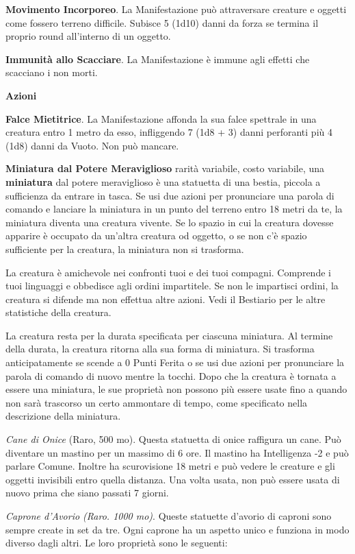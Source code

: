\begin{multicols}{2}
\textbf{Movimento Incorporeo}. La Manifestazione può attraversare creature e oggetti come fossero terreno difficile. Subisce 5 (1d10) danni da forza se termina il proprio round all'interno di un oggetto.

\textbf{Immunità allo Scacciare}. La Manifestazione è immune agli effetti che scacciano i non morti.

\textbf{Azioni}

\textbf{Falce Mietitrice}. La Manifestazione affonda la sua falce spettrale in una creatura entro 1 metro da esso, infliggendo 7 (1d8 + 3) danni perforanti più 4 (1d8) danni da Vuoto. Non può mancare.

\smallskip*\hypertarget{Miniatura dal Potere Meraviglioso}{} \textbf{Miniatura dal Potere Meraviglioso} rarità variabile, costo variabile, una \textbf{miniatura} dal potere meraviglioso è una statuetta di una bestia, piccola a sufficienza da entrare in tasca. Se usi due azioni per pronunciare una parola di comando e lanciare la miniatura in un punto del terreno entro 18 metri da te, la miniatura diventa una creatura vivente. Se lo spazio in cui la creatura dovesse apparire è occupato da un'altra creatura od oggetto, o se non c'è spazio sufficiente per la creatura, la miniatura non si trasforma.

La creatura è amichevole nei confronti tuoi e dei tuoi compagni. Comprende i tuoi linguaggi e obbedisce agli ordini impartitele. Se non le impartisci ordini, la creatura si difende ma non effettua altre azioni. Vedi il Bestiario per le altre statistiche della creatura.

La creatura resta per la durata specificata per ciascuna miniatura. Al termine della durata, la creatura ritorna alla sua forma di miniatura. Si trasforma anticipatamente se scende a 0 Punti Ferita o se usi due azioni per pronunciare la parola di comando di nuovo mentre la tocchi. Dopo che la creatura è tornata a essere una miniatura, le sue proprietà non possono più essere usate fino a quando non sarà trascorso un certo ammontare di tempo, come specificato nella descrizione della miniatura.

\emph{Cane di Onice} (Raro, 500 mo). Questa statuetta di onice raffigura un cane. Può diventare un mastino per un massimo di 6 ore. Il mastino ha Intelligenza -2 e può parlare Comune. Inoltre ha scurovisione 18 metri e può vedere le creature e gli oggetti invisibili entro quella distanza. Una volta usata, non può essere usata di nuovo prima che siano passati 7 giorni.

\emph{Caprone d'Avorio (Raro. 1000 mo)}. Queste statuette d'avorio di caproni sono sempre create in set da tre. Ogni caprone ha un aspetto unico e funziona in modo diverso dagli altri. Le loro proprietà sono le seguenti:


\end{multicols}
